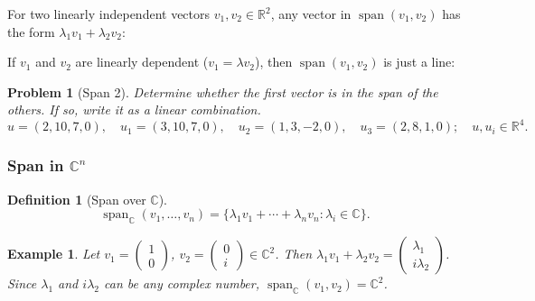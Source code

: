 \documentclass{article}
\newtheorem{definition}{Definition}
\newtheorem{problem}{Problem}
\newtheorem*{example}{Example}
\newcommand{\Span}{\operatorname{span}}
\begin{document}
For two linearly independent vectors $v_1, v_2 \in \mathbb{R}^2$, any vector in $\Span(v_1,v_2)$ has the form $\lambda_1 v_1 + \lambda_2 v_2$:
\begin{center}
\end{center}
If $v_1$ and $v_2$ are linearly dependent ($v_1 = \lambda v_2$), then $\Span(v_1,v_2)$ is just a line:
\begin{center}
\end{center}
\begin{problem}[Span 2]
    Determine whether the first vector is in the span of the others. If so, write it as a linear combination.
    \[u = (2,10,7,0),\quad u_1 = (3,10,7,0),\quad u_2 = (1,3,-2,0),\quad u_3 = (2,8,1,0);\quad u,u_i \in \mathbb{R}^4.\]
\end{problem}

\subsubsection{Span in $\mathbb{C}^n$}
\begin{definition}[Span over $\mathbb{C}$]
    \[\Span_{\mathbb{C}}(v_1,\ldots,v_n) = \{\lambda_1 v_1 + \cdots + \lambda_n v_n : \lambda_i \in \mathbb{C}\}.\]
\end{definition}
\begin{example}
    Let $v_1=\begin{pmatrix}1\\0\end{pmatrix}$, $v_2=\begin{pmatrix}0\\i\end{pmatrix} \in \mathbb{C}^2$. Then $\lambda_1v_1+\lambda_2v_2 = \begin{pmatrix}\lambda_1\\i\lambda_2\end{pmatrix}$. Since $\lambda_1$ and $i\lambda_2$ can be any complex number, $\Span_{\mathbb{C}}(v_1,v_2) = \mathbb{C}^2$.
\end{example}
\end{document}
